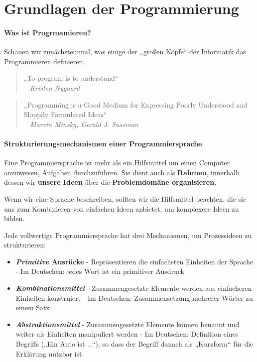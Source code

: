 
\chapter{Grundlagen der Programmierung}
\label{c:grundlagen}
\setcounter{page}{1}
\subsubsection{Was ist Progrmamieren?}

Schauen wir zunächsteinmal, was einige der „großen Köpfe“ der
Informatik das Programmieren definieren.

\begin{quote}
	„To program is to understand“ \\
	\textit{~ Kristen Nygaard}
\end{quote}

\begin{quote}
	„Programming is a Good Medium for Expressing Poorly
	Understood and Sloppily Formulated Ideas“\\
	\textit{~ Marvin Minsky, Gerald J. Sussman}
\end{quote}

\subsubsection{Strukturierungsmechanismen einer
Programmiersprache}

Eine Programmiersprache ist mehr als ein Hilfsmittel um einen
Computer anzuweisen, Aufgaben durchzuführen.
Sie dient auch als \textbf{Rahmen}, innerhalb dessen wir \textbf{unsere
Ideen} über die \textbf{Problemdomäne organisieren.}

Wenn wir eine Sprache beschreiben, sollten wir
die Hilfsmittel beachten, die sie uns zum
Kombinieren von einfachen Ideen anbietet, um
komplexere Ideen zu bilden.

Jede vollwertige Programmiersprache hat drei Mechanismen,
um Prozessideen zu strukturieren:

\begin{itemize}
	\item \textbf{\textit{Primitive} Ausrücke}
		\subitem - Repräsentieren die einfachsten Einheiten der Sprache
		\subitem - Im Deutschen: jedes Wort ist ein primitiver Ausdruck
	\item \textbf{\textit{Kombinationsmittel}}
		\subitem - Zusammengesetzte Elemente werden aus einfacheren Einheiten
		konstruiert
		\subitem - Im Deutschen: Zusammensetzung mehrerer Wörter zu einem Satz.
	\item \textbf{\textit{Abstraktionsmittel}}
		\subitem - Zusammengesetzte Elemente können benannt und weiter als Einheiten manipuliert werden
		\subitem - Im Deutschen: Definition eines Begriffs („Ein Auto ist ...“), so dass der Begriff danach als „Kurzform“ für die Erklärung nutzbar ist
\end{itemize}

